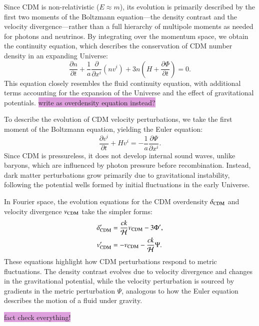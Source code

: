 \documentclass{aa}
\numberwithin{equation}{section}
\numberwithin{table}{section}
\numberwithin{figure}{section}
\begin{document}
Since CDM is non-relativistic ($E \approx m$), its evolution is primarily described by the first two moments of the Boltzmann equation—the density contrast and the velocity divergence—rather than a full hierarchy of multipole moments as needed for photons and neutrinos. By integrating over the momentum space, we obtain the continuity equation, which describes the conservation of CDM number density in an expanding Universe:
\begin{equation}
\frac{\partial n}{\partial t} + \frac{1}{a} \frac{\partial}{\partial x^i} \left(n v^i\right) + 3 n \left(H + \frac{\partial \Phi}{\partial t} \right) = 0.
\end{equation}
This equation closely resembles the fluid continuity equation, with additional terms accounting for the expansion of the Universe and the effect of gravitational potentials. \colorbox{Plum}{write as overdensity equation instead?}

To describe the evolution of CDM velocity perturbations, we take the first moment of the Boltzmann equation, yielding the Euler equation:
\begin{equation}
\frac{\partial v^i}{\partial t} + H v^i = -\frac{1}{a} \frac{\partial \Psi}{\partial x^i}.
\end{equation}
Since CDM is pressureless, it does not develop internal sound waves, unlike baryons, which are influenced by photon pressure before recombination. Instead, dark matter perturbations grow primarily due to gravitational instability, following the potential wells formed by initial fluctuations in the early Universe.

In Fourier space, the evolution equations for the CDM overdensity $\delta_{\rm CDM}$ and velocity divergence $v_{\rm CDM}$ take the simpler forms:
\begin{align}
\delta_{\rm CDM}' &= \frac{c k}{\mathcal{H}} v_{\rm CDM} - 3 \Phi', \\
v_{\rm CDM}' &= - v_{\rm CDM} - \frac{c k}{\mathcal{H}} \Psi.
\end{align}
These equations highlight how CDM perturbations respond to metric fluctuations. The density contrast evolves due to velocity divergence and changes in the gravitational potential, while the velocity perturbation is sourced by gradients in the metric perturbation $\Psi$, analogous to how the Euler equation describes the motion of a fluid under gravity. 

\colorbox{Plum}{fact check everything!}

\end{document}

